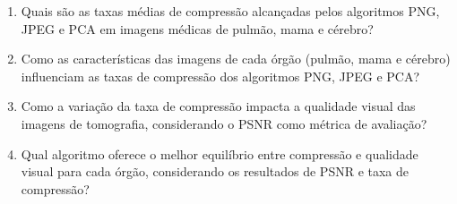 \begin{enumerate}
    \item Quais são as taxas médias de compressão alcançadas pelos algoritmos \acrshort{PNG}, \acrshort{JPEG} e \acrshort{PCA} em imagens médicas de pulmão, mama e cérebro?
    \item Como as características das imagens de cada órgão (pulmão, mama e cérebro) influenciam as taxas de compressão dos algoritmos \acrshort{PNG}, \acrshort{JPEG} e \acrshort{PCA}?
    \item Como a variação da taxa de compressão impacta a qualidade visual das imagens de tomografia, considerando o \acrfull{PSNR} como métrica de avaliação?
    \item Qual algoritmo oferece o melhor equilíbrio entre compressão e qualidade visual para cada órgão, considerando os resultados de \acrshort{PSNR} e taxa de compressão?
\end{enumerate}

    


